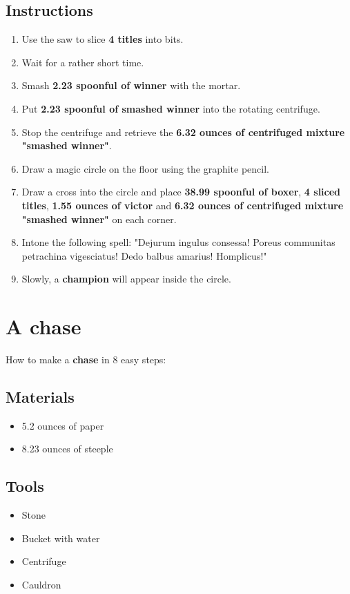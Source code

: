 \documentclass{article}
\begin{document}
\subsection{Instructions}\begin{enumerate}
\item 
Use the saw to slice \textbf{4 titles} into bits.
\item 
Wait for a rather short time.
\item 
Smash \textbf{2.23 spoonful of winner} with the mortar.
\item 
Put \textbf{2.23 spoonful of smashed winner} into the rotating centrifuge.
\item 
Stop the centrifuge and retrieve the \textbf{6.32 ounces of centrifuged mixture "smashed winner"}.
\item 
Draw a magic circle on the floor using the graphite pencil.
\item 
Draw a cross into the circle and place \textbf{38.99 spoonful of boxer}, \textbf{4 sliced titles}, \textbf{1.55 ounces of victor} and \textbf{6.32 ounces of centrifuged mixture "smashed winner"} on each corner.
\item 
Intone the following spell: "Dejurum ingulus consessa! Poreus communitas petrachina vigesciatus! Dedo balbus amarius! Homplicus!"
\item 
Slowly, a \textbf{champion} will appear inside the circle.
\end{enumerate}
\newpage
\section{A chase}How to make a \textbf{chase} in 8 easy steps:

\subsection{Materials}\begin{itemize}
\item 
5.2 ounces of paper
\item 
8.23 ounces of steeple
\end{itemize}
\subsection{Tools}\begin{itemize}
\item 
Stone
\item 
Bucket with water
\item 
Centrifuge
\item 
Cauldron
\end{itemize}
\end{document}
